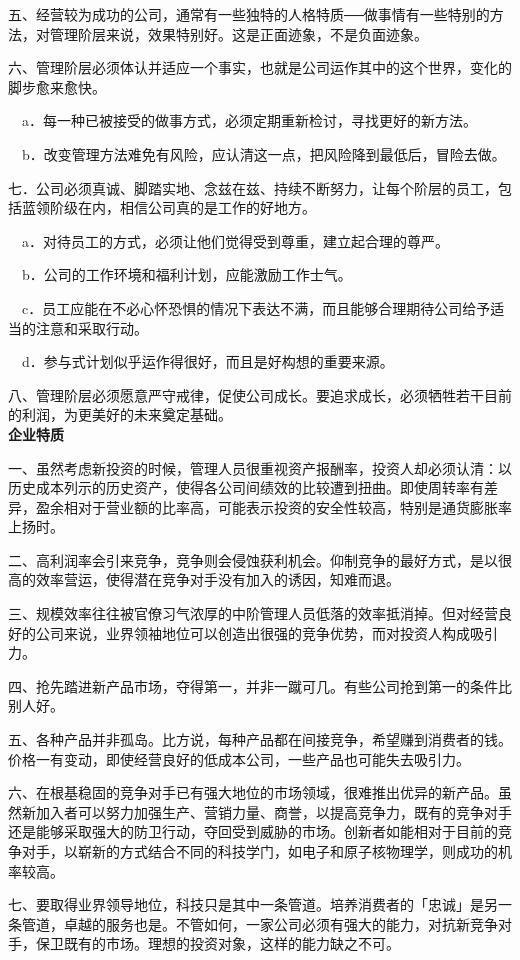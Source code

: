 \documentclass[UTF8,a4paper,zihao=-4,fontset = windows]{ctexart} %
\begin{document}
五、经营较为成功的公司，通常有一些独特的人格特质──做事情有一些特别的方法，对管理阶层来说，效果特别好。这是正面迹象，不是负面迹象。

六、管理阶层必须体认并适应一个事实，也就是公司运作其中的这个世界，变化的脚步愈来愈快。

　a．每一种已被接受的做事方式，必须定期重新检讨，寻找更好的新方法。

　b．改变管理方法难免有风险，应认清这一点，把风险降到最低后，冒险去做。

七．公司必须真诚、脚踏实地、念兹在兹、持续不断努力，让每个阶层的员工，包括蓝领阶级在内，相信公司真的是工作的好地方。

　a．对待员工的方式，必须让他们觉得受到尊重，建立起合理的尊严。

　b．公司的工作环境和福利计划，应能激励工作士气。

　c．员工应能在不必心怀恐惧的情况下表达不满，而且能够合理期待公司给予适当的注意和采取行动。

　d．参与式计划似乎运作得很好，而且是好构想的重要来源。

八、管理阶层必须愿意严守戒律，促使公司成长。要追求成长，必须牺牲若干目前的利润，为更美好的未来奠定基础。
\\

\textbf{企业特质}


一、虽然考虑新投资的时候，管理人员很重视资产报酬率，投资人却必须认清：以历史成本列示的历史资产，使得各公司间绩效的比较遭到扭曲。即使周转率有差异，盈余相对于营业额的比率高，可能表示投资的安全性较高，特别是通货膨胀率上扬时。

二、高利润率会引来竞争，竞争则会侵蚀获利机会。仰制竞争的最好方式，是以很高的效率营运，使得潜在竞争对手没有加入的诱因，知难而退。

三、规模效率往往被官僚习气浓厚的中阶管理人员低落的效率抵消掉。但对经营良好的公司来说，业界领袖地位可以创造出很强的竞争优势，而对投资人构成吸引力。

四、抢先踏进新产品市场，夺得第一，并非一蹴可几。有些公司抢到第一的条件比别人好。

五、各种产品并非孤岛。比方说，每种产品都在间接竞争，希望赚到消费者的钱。价格一有变动，即使经营良好的低成本公司，一些产品也可能失去吸引力。

六、在根基稳固的竞争对手已有强大地位的市场领域，很难推出优异的新产品。虽然新加入者可以努力加强生产、营销力量、商誉，以提高竞争力，既有的竞争对手还是能够采取强大的防卫行动，夺回受到威胁的市场。创新者如能相对于目前的竞争对手，以崭新的方式结合不同的科技学门，如电子和原子核物理学，则成功的机率较高。

七、要取得业界领导地位，科技只是其中一条管道。培养消费者的「忠诚」是另一条管道，卓越的服务也是。不管如何，一家公司必须有强大的能力，对抗新竞争对手，保卫既有的市场。理想的投资对象，这样的能力缺之不可。
\end{document}
